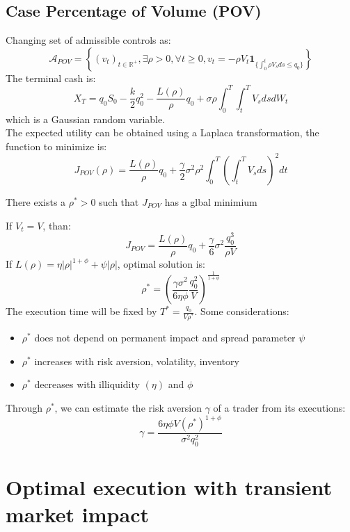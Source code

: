 \subsection{Case Percentage of Volume (POV)}
Changing set of admissible controls as:
\[
\mathcal{A}_{POV} = \left\{(v_t)_{t \in \mathbb{R}^+}, \exists \rho > 0, \forall t \geq 0, v_t = -\rho V_t \mathbf{1}_{\{\int_{0}^{t} \rho V_s ds \leq q_0\}}\right\}
\]
The terminal cash is:
\[
X_T = q_0S_0 - \frac{k}{2}q^2_0 - \frac{L(\rho)}{\rho}q_0 + \sigma \rho \int_{0}^{T} \int_{t}^{T} V_s dsdW_t
\]
which is a Gaussian random variable.\\
The expected utility can be obtained using a Laplaca transformation, the function to minimize is:
\[
J_{POV}(\rho) = \frac{L(\rho)}{\rho}q_0 + \frac{\gamma}{2} \sigma^2 \rho^2 \int_{0}^{T} \left(\int_t^T V_s ds\right)^2dt
\]
\begin{mytheorem}
	There exists a $\rho^*>0$ such that $J_{POV}$ has a glbal minimium
\end{mytheorem}
If $V_t = V$, than:
\[
J_{POV} = \frac{L(\rho)}{\rho}q_0 + \frac{\gamma}{6}\sigma^2 \frac{q_0^3}{\rho V}
\]
If $L(\rho) = \eta |\rho|^{1+ \phi} + \psi |\rho|$, optimal solution is:
\[
\rho^* = \left(\frac{\gamma \sigma^2}{6 \eta \phi}\frac{q_0^2}{V}\right)^{\frac{1}{1 + \phi}}
\]
The execution time will be fixed by $T^* = \frac{q_0}{V \rho^*}$. Some considerations:
\begin{itemize}
	\item $\rho^*$ does not depend on permanent impact and spread parameter $\psi$
	\item $\rho^*$ increases with risk aversion, volatility, inventory
	\item $\rho^*$ decreases with illiquidity $(\eta)$ and $\phi$
\end{itemize}
Through $\rho^*$, we can estimate the risk aversion $\gamma$ of a trader from its executions:
\[
\gamma = \frac{6 \eta \phi V(\rho^*)^{1+ \phi}}{\sigma^2 q_0^2}
\]
\section{Optimal execution with transient market impact}

